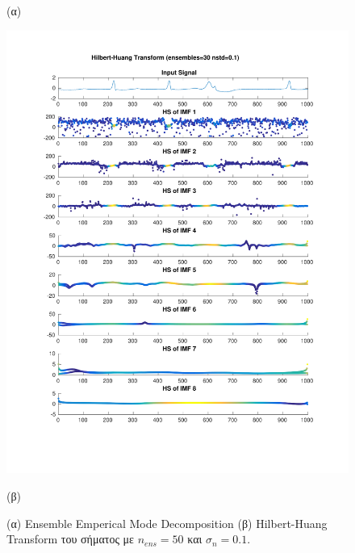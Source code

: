 \documentclass[11pt,a4paper]{article}
\begin{document}
\begin{figure}[H]
\begin{minipage}{0.48\textwidth}
	(α)
\end{minipage}
\begin{minipage}{0.48\textwidth}
	\centering
	\includegraphics[width=\textwidth]{fig/221l1_hht_ensemble.pdf}
	
	(β)
\end{minipage}
\vfill
\caption{(α) Ensemble Emperical Mode Decomposition (β) Hilbert-Huang Transform του σήματος με $n_{ens}=50$ και $\sigma_n = 0.1$.}
\label{fig:221l1_hht_ensemble}
\end{figure}
\end{document}
